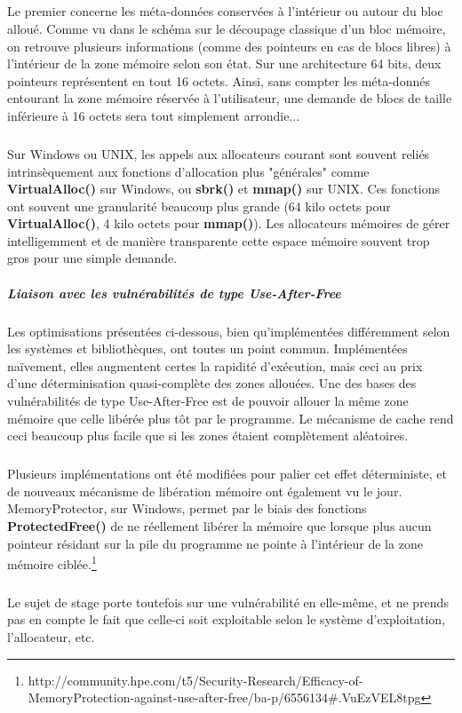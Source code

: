 \subparagraph{}
Le premier concerne les méta-données conservées à l'intérieur ou autour du bloc alloué. Comme vu dans le schéma sur le découpage classique d'un bloc mémoire,
on retrouve plusieurs informations (comme des pointeurs en cas de blocs libres) à l'intérieur de la zone mémoire selon son état. Sur une architecture 64 bits,
deux pointeurs représentent en tout 16 octets. Ainsi, sans compter les méta-donnés entourant la zone mémoire réservée à l'utilisateur, une demande de blocs de taille
inférieure à 16 octets sera tout simplement arrondie...
\subparagraph{}
Sur Windows ou UNIX, les appels aux allocateurs courant sont souvent reliés intrinsèquement aux fonctions d'allocation plus "générales" comme  \textbf{VirtualAlloc()} sur
Windows, ou \textbf{sbrk()} et \textbf{mmap()} sur UNIX. Ces fonctions ont souvent une granularité beaucoup plus grande (64 kilo octets pour \textbf{VirtualAlloc()}, 4 kilo octets
pour \textbf{mmap()}). Les allocateurs mémoires de gérer intelligemment et de manière transparente cette espace mémoire souvent trop gros pour une simple demande.

\subparagraph{Liaison avec les vulnérabilités de type Use-After-Free}
Les optimisations présentées ci-dessous, bien qu'implémentées différemment selon les systèmes et bibliothèques, ont toutes un point commun.
Implémentées naïvement, elles augmentent certes la rapidité d'exécution, mais ceci au prix d'une déterminisation quasi-complète des zones allouées.
Une des bases des vulnérabilités de type Use-After-Free est de pouvoir allouer la même zone mémoire que celle libérée plus tôt par le programme.
Le mécanisme de cache rend ceci beaucoup plus facile que si les zones étaient complètement aléatoires.

\subparagraph{}
Plusieurs implémentations ont été modifiées pour palier cet effet déterministe, et de nouveaux mécanisme de libération mémoire ont également vu le jour.
MemoryProtector, sur Windows, permet par le biais des fonctions \textbf{ProtectedFree()} de ne réellement libérer la mémoire que lorsque plus aucun pointeur
résidant sur la pile du programme ne pointe à l'intérieur de la zone mémoire ciblée.\footnote{http://community.hpe.com/t5/Security-Research/Efficacy-of-MemoryProtection-against-use-after-free/ba-p/6556134\#.VuEzVEL8tpg}


\subparagraph{}
Le sujet de stage porte toutefois sur une vulnérabilité en elle-même, et ne prends pas en compte le fait que celle-ci soit exploitable selon
le système d'exploitation, l'allocateur, etc.


